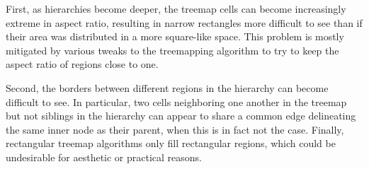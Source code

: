 \documentclass{acm_proc_article-sp} \usepackage{cite}
\begin{document}
First, as hierarchies become deeper, the treemap cells can become
increasingly extreme in aspect ratio, resulting in narrow rectangles
more difficult to see than if their area was distributed in a more
square-like space. This problem is mostly mitigated by various tweaks
to the treemapping algorithm to try to keep the aspect ratio of
regions close to one.

Second, the borders between different regions in the hierarchy can
become difficult to see. In particular, two cells neighboring one
another in the treemap but not siblings in the hierarchy can appear to
share a common edge delineating the same inner node as their parent,
when this is in fact not the case.  Finally, rectangular treemap
algorithms only fill rectangular regions, which could be
undesirable for aesthetic or practical reasons.


%
\end{document}
